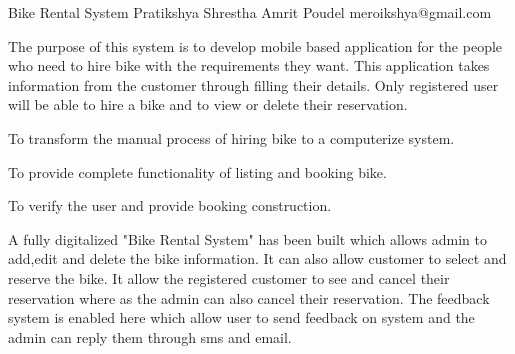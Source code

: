  \begin{conf-abstract}[]
 {Bike Rental System}
 {Pratikshya Shrestha 
 	 Amrit Poudel
 }
{meroikshya@gmail.com}

The purpose of this system is to develop mobile based application for the people who need to hire bike with the requirements they want.
This application takes information from the customer through filling their details.
Only registered user will be able to hire a bike and to view or delete their reservation.

To transform the manual process of hiring bike to a computerize system.

To provide complete functionality of listing and booking bike.

To verify the user and provide booking construction.


A fully digitalized "Bike Rental System" has been built which allows admin to add,edit and delete the bike information. 
It can also allow customer to select and reserve the bike. 
It allow the registered customer to see and cancel their reservation where as the admin can also cancel  their reservation.
The feedback system is enabled here which allow user to send feedback on system and the admin can reply them through sms and email.


 \end{conf-abstract}